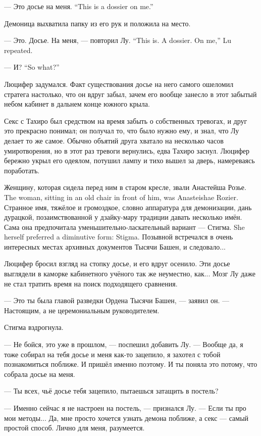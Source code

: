 {--- Это досье на меня.}
{``This is a dossier on me.''}

Демоница выхватила папку из его рук и положила на место.

{--- Это. Досье. На меня, --- повторил Лу.}
{``This is. A dossier. On me,'' Lu repeated.}

{--- И?}
{``So what?''}

Люцифер задумался.
Факт существования досье на него самого ошеломил стратега настолько, что он вдруг забыл, зачем его вообще занесло в этот забытый небом кабинет в дальнем конце южного крыла.

Секс с Тахиро был средством на время забыть о собственных тревогах, и друг это прекрасно понимал;
он получал то, что было нужно ему, и знал, что Лу делает то же самое.
Обычно объятий друга хватало на несколько часов умиротворения, но в этот раз тревоги вернулись, едва Тахиро заснул.
Люцифер бережно укрыл его одеялом, потушил лампу и тихо вышел за дверь, намереваясь поработать.

{Женщину, которая сидела перед ним в старом кресле, звали Анастейша Розье.}
{The woman, sitting in an old chair in front of him, was Anasteishae Rozier.}
Странное имя, тяжёлое и громоздкое, словно аппаратура для демонизации, дань дурацкой, позаимствованной у дзайку-мару традиции давать несколько имён.
{Сама она предпочитала уменьшительно-ласкательный вариант --- Стигма.}
{She herself preferred a diminutive form: Stigma.}
Позывной встречался в очень интересных местах архивных документов Тысячи Башен, и следовало...

Люцифер бросил взгляд на стопку досье, и его вдруг осенило.
Эти досье выглядели в каморке кабинетного учёного так же неуместно, как...
Мозг Лу даже не стал тратить время на поиск подходящего сравнения.

--- Это ты была главой разведки Ордена Тысячи Башен, --- заявил он.
--- Настоящим, а не церемониальным руководителем.

Стигма вздрогнула.

--- Не бойся, это уже в прошлом, --- поспешил добавить Лу.
--- Вообще да, я тоже собирал на тебя досье и меня как-то зацепило, я захотел с тобой познакомиться поближе.
И пришёл именно поэтому.
И ты поняла это потому, что собрала досье на меня.

--- Ты всех, чьё досье тебя зацепило, пытаешься затащить в постель?

--- Именно сейчас я не настроен на постель, --- признался Лу.
--- Если ты про мои методы...
Да, мне просто хочется узнать демона поближе, а секс --- самый простой способ.
Лично для меня, разумеется.

